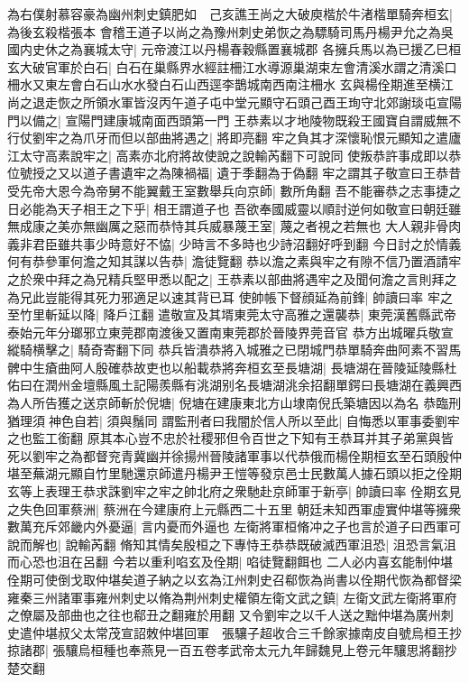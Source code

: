 為右僕射慕容豪為幽州刺史鎮肥如　己亥譙王尚之大破庾楷於牛渚楷單騎奔桓玄|{
	為後玄殺楷張本}
會稽王道子以尚之為豫州刺史弟恢之為驃騎司馬丹楊尹允之為吳國内史休之為襄城太守|{
	元帝渡江以丹楊春穀縣置襄城郡}
各擁兵馬以為已援乙巳桓玄大破官軍於白石|{
	白石在巢縣界水經註柵江水導源巢湖束左會清溪水謂之清溪口柵水又東左會白石山水水發白石山西逕李鵲城南西南注柵水}
玄與楊佺期進至横江尚之退走恢之所領水軍皆沒丙午道子屯中堂元顯守石頭己酉王珣守北郊謝琰屯宣陽門以備之|{
	宣陽門建康城南面西頭第一門}
王恭素以才地陵物既殺王國寶自謂威無不行仗劉牢之為爪牙而但以部曲將遇之|{
	將即亮翻}
牢之負其才深懷恥恨元顯知之遣廬江太守高素說牢之|{
	高素亦北府將故使說之說輸芮翻下可說同}
使叛恭許事成即以恭位號授之又以道子書遺牢之為陳禍福|{
	遺于季翻為于偽翻}
牢之謂其子敬宣曰王恭昔受先帝大恩今為帝舅不能翼戴王室數舉兵向京師|{
	數所角翻}
吾不能審恭之志事捷之日必能為天子相王之下乎|{
	相王謂道子也}
吾欲奉國威靈以順討逆何如敬宣曰朝廷雖無成康之美亦無幽厲之惡而恭恃其兵威暴蔑王室|{
	蔑之者視之若無也}
大人親非骨肉義非君臣雖共事少時意好不恊|{
	少時言不多時也少詩沼翻好呼到翻}
今日討之於情義何有恭參軍何澹之知其謀以告恭|{
	澹徒覽翻}
恭以澹之素與牢之有隙不信乃置酒請牢之於衆中拜之為兄精兵堅甲悉以配之|{
	王恭素以部曲將遇牢之及聞何澹之言則拜之為兄此豈能得其死力邪適足以速其背已耳}
使帥帳下督顔延為前鋒|{
	帥讀曰率}
牢之至竹里斬延以降|{
	降戶江翻}
遣敬宣及其壻東莞太守高雅之還襲恭|{
	東莞漢舊縣武帝泰始元年分瑯邪立東莞郡南渡後又置南東莞郡於晉陵界莞音官}
恭方出城曜兵敬宣縱騎横擊之|{
	騎奇寄翻下同}
恭兵皆潰恭將入城雅之已閉城門恭單騎奔曲阿素不習馬髀中生瘡曲阿人殷確恭故吏也以船載恭將奔桓玄至長塘湖|{
	長塘湖在晉陵延陵縣杜佑曰在潤州金壇縣風土記陽羨縣有洮湖别名長塘湖洮余招翻單鍔曰長塘湖在義興西}
為人所告獲之送京師斬於倪塘|{
	倪塘在建康東北方山埭南倪氏築塘因以為名}
恭臨刑猶理須神色自若|{
	須與鬚同}
謂監刑者曰我闇於信人所以至此|{
	自悔悉以軍事委劉牢之也監工銜翻}
原其本心豈不忠於社稷邪但令百世之下知有王恭耳并其子弟黨與皆死以劉牢之為都督兖青冀幽并徐揚州晉陵諸軍事以代恭俄而楊佺期桓玄至石頭殷仲堪至蕪湖元顯自竹里馳還京師遣丹楊尹王愷等發京邑士民數萬人據石頭以拒之佺期玄等上表理王恭求誅劉牢之牢之帥北府之衆馳赴京師軍于新亭|{
	帥讀曰率}
佺期玄見之失色回軍蔡洲|{
	蔡洲在今建康府上元縣西二十五里}
朝廷未知西軍虛實仲堪等擁衆數萬充斥郊畿内外憂逼|{
	言内憂而外逼也}
左衛將軍桓脩冲之子也言於道子曰西軍可說而解也|{
	說輸芮翻}
脩知其情矣殷桓之下專恃王恭恭既破滅西軍沮恐|{
	沮恐言氣沮而心恐也沮在呂翻}
今若以重利啗玄及佺期|{
	啗徒覽翻餌也}
二人必内喜玄能制仲堪佺期可使倒戈取仲堪矣道子納之以玄為江州刺史召郗恢為尚書以佺期代恢為都督梁雍秦三州諸軍事雍州刺史以脩為荆州刺史權領左衛文武之鎮|{
	左衛文武左衛將軍府之僚屬及部曲也之往也郗丑之翻雍於用翻}
又令劉牢之以千人送之黜仲堪為廣州刺史遣仲堪叔父太常茂宣詔敇仲堪回軍　張驤子超收合三千餘家據南皮自號烏桓王抄掠諸郡|{
	張驤烏桓種也奉燕見一百五卷孝武帝太元九年歸魏見上卷元年驤思將翻抄楚交翻}
